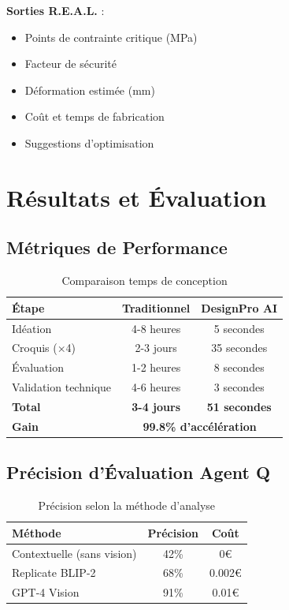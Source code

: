 \documentclass[12pt,a4paper]{article}
\begin{document}
\textbf{Sorties R.E.A.L.} :
\begin{itemize}
    \item Points de contrainte critique (MPa)
    \item Facteur de sécurité
    \item Déformation estimée (mm)
    \item Coût et temps de fabrication
    \item Suggestions d'optimisation
\end{itemize}

\section{Résultats et Évaluation}

\subsection{Métriques de Performance}

\begin{table}[H]
\centering
\caption{Comparaison temps de conception}
\begin{tabular}{@{}lcc@{}}
\toprule
\textbf{Étape} & \textbf{Traditionnel} & \textbf{DesignPro AI} \\ 
\midrule
Idéation & 4-8 heures & 5 secondes \\
Croquis (×4) & 2-3 jours & 35 secondes \\
Évaluation & 1-2 heures & 8 secondes \\
Validation technique & 4-6 heures & 3 secondes \\
\midrule
\textbf{Total} & \textbf{3-4 jours} & \textbf{51 secondes} \\
\textbf{Gain} & \multicolumn{2}{c}{\textbf{99.8\% d'accélération}} \\
\bottomrule
\end{tabular}
\end{table}

\subsection{Précision d'Évaluation Agent Q}

\begin{table}[H]
\centering
\caption{Précision selon la méthode d'analyse}
\begin{tabular}{@{}lcc@{}}
\toprule
\textbf{Méthode} & \textbf{Précision} & \textbf{Coût} \\ 
\midrule
Contextuelle (sans vision) & 42\% & 0€ \\
Replicate BLIP-2 & 68\% & 0.002€ \\
GPT-4 Vision & 91\% & 0.01€ \\
\bottomrule
\end{tabular}
\end{table}
\end{document}
